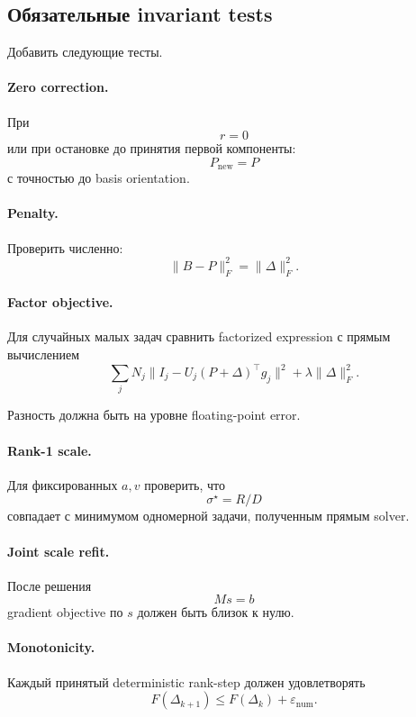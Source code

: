 \subsection{Обязательные invariant tests}

Добавить следующие тесты.

\paragraph{Zero correction.}

При
\[
    r=0
\]
или при остановке до принятия первой компоненты:
\[
    P_{\mathrm{new}}=P
\]
с точностью до basis orientation.

\paragraph{Penalty.}

Проверить численно:
\[
    \|B-P\|_F^2
    =
    \|\Delta\|_F^2.
\]

\paragraph{Factor objective.}

Для случайных малых задач сравнить factorized expression с прямым
вычислением
\[
    \sum_j
    N_j
    \|I_j-U_j(P+\Delta)^\top g_j\|^2
    +
    \lambda\|\Delta\|_F^2.
\]

Разность должна быть на уровне floating-point error.

\paragraph{Rank-1 scale.}

Для фиксированных $a,v$ проверить, что
\[
    \sigma^\star=R/D
\]
совпадает с минимумом одномерной задачи, полученным прямым solver.

\paragraph{Joint scale refit.}

После решения
\[
    Ms=b
\]
gradient objective по $s$ должен быть близок к нулю.

\paragraph{Monotonicity.}

Каждый принятый deterministic rank-step должен удовлетворять
\[
    F(\Delta_{k+1})
    \le
    F(\Delta_k)
    +
    \varepsilon_{\mathrm{num}}.
\]


